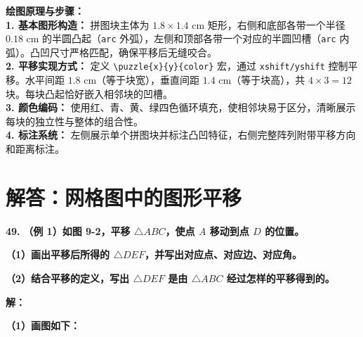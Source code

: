 \vspace{0.4cm}
{\small\color{blue!70!black}
\textbf{绘图原理与步骤：}\\
\textbf{1. 基本图形构造：} 拼图块主体为 $1.8 \times 1.4$ cm 矩形，右侧和底部各带一个半径 $0.18$ cm 的半圆凸起（\texttt{arc} 外弧），左侧和顶部各带一个对应的半圆凹槽（\texttt{arc} 内弧）。凸凹尺寸严格匹配，确保平移后无缝咬合。\\
\textbf{2. 平移实现方式：} 定义 \texttt{\textbackslash{}puzzle\{x\}\{y\}\{color\}} 宏，通过 \texttt{xshift/yshift} 控制平移。水平间距 $1.8$ cm（等于块宽），垂直间距 $1.4$ cm（等于块高），共 $4 \times 3 = 12$ 块。每块凸起恰好嵌入相邻块的凹槽。\\
\textbf{3. 颜色编码：} 使用红、青、黄、绿四色循环填充，使相邻块易于区分，清晰展示每块的独立性与整体的组合性。\\
\textbf{4. 标注系统：} 左侧展示单个拼图块并标注凸凹特征，右侧完整阵列附带平移方向和距离标注。
}
\newpage



\newpage

\section{解答：网格图中的图形平移}

\vspace{0.6cm}

\textbf{\LARGE 49.} \textbf{（例 1）如图 9-2，平移 $\triangle ABC$，使点 $A$ 移动到点 $D$ 的位置。}

\textbf{（1）画出平移后所得的 $\triangle DEF$，并写出对应点、对应边、对应角。}

\textbf{（2）结合平移的定义，写出 $\triangle DEF$ 是由 $\triangle ABC$ 经过怎样的平移得到的。}

\vspace{0.4cm}
\textbf{解：}

\textbf{（1）画图如下：}

